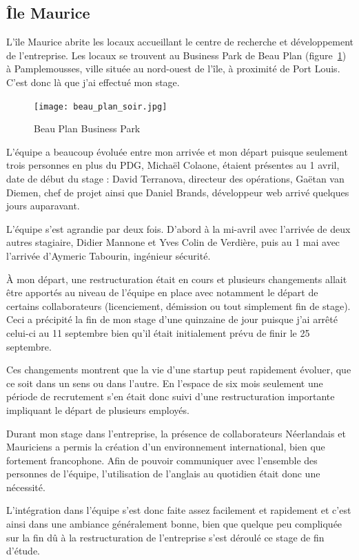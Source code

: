 \documentclass[a4paper,10pt, twoside]{report}
\begin{document}
\begin{spacing}{1.2}
\section{Île Maurice}
L'île Maurice abrite les locaux accueillant le centre de recherche et
développement de l'entreprise. Les locaux se trouvent au Business Park de
Beau Plan (figure~\ref{beauPlan}) à Pamplemousses, ville située au
nord-ouest de l'île, à proximité de Port Louis. C'est donc là que
j'ai effectué mon stage.

\begin{figure}[h!]
  \centering
  \texttt{[image: beau\_plan\_soir.jpg]}
  \caption{\label{beauPlan} Beau Plan Business Park}
\end{figure}

L'équipe a beaucoup évoluée entre mon arrivée et mon départ puisque
seulement trois personnes en plus du PDG, Michaël Colaone, étaient
présentes au 1 avril, date de début du stage : David Terranova,
directeur des opérations, Gaëtan van Diemen, chef de projet ainsi que
Daniel Brands, développeur web arrivé quelques jours auparavant.

L'équipe s'est agrandie par deux fois. D'abord à la mi-avril avec
l'arrivée de deux autres stagiaire, Didier Mannone et
Yves Colin de Verdière, puis au 1 mai avec l'arrivée d'Aymeric
Tabourin, ingénieur sécurité.

À mon départ, une restructuration était en cours et plusieurs changements
allait être apportés au niveau de l'équipe en place avec notamment le
départ de certains collaborateurs (licenciement, démission ou tout
simplement fin de stage). Ceci a précipité la fin de mon stage d'une
quinzaine de jour puisque j'ai arrêté celui-ci au 11 septembre bien qu'il
était initialement prévu de finir le 25 septembre.

Ces changements montrent que la vie d'une startup peut rapidement évoluer,
que ce soit dans un sens ou dans l'autre. En l'espace de six mois seulement
une période de recrutement s'en était donc suivi d'une restructuration
importante impliquant le départ de plusieurs employés.

Durant mon stage dans l'entreprise, la présence de collaborateurs
Néerlandais et Mauriciens a permis la création d'un environnement
international, bien que fortement francophone. Afin de pouvoir communiquer avec
l'ensemble des personnes de l'équipe, l'utilisation de l'anglais au quotidien
était donc une nécessité.

L'intégration dans l'équipe s'est donc faite assez facilement et rapidement
et c'est ainsi dans une ambiance généralement bonne, bien que quelque peu
compliquée sur la fin dû à la restructuration de l'entreprise s'est
déroulé ce stage de fin d'étude.


\end{spacing}
\end{document}
